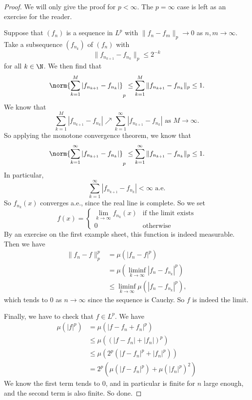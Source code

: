 \documentclass[a4paper]{article}
\begin{document}
\begin{proof}
  We will only give the proof for $p < \infty$. The $p = \infty$ case is left as an exercise for the reader.

  Suppose that $(f_n)$ is a sequence in $L^p$ with $\|f_n - f_m\|_p \to 0$ as $n, m \to \infty$. Take a subsequence $(f_{n_k})$ of $(f_n)$ with
  \[
    \|f_{n_{k + 1}} - f_{n_k}\|_p \leq 2^{-k}
  \]
  for all $k \in \N$. We then find that
  \[
    \norm{\sum_{k = 1}^M |f_{n_{k + 1}} - f_{n_k}|}_p \leq \sum_{k = 1}^M \|f_{n_{k + 1}} - f_{n_k}\|_p \leq 1.
  \]
  We know that
  \[
    \sum_{k = 1}^M |f_{n_{k + 1}} - f_{n_k}| \nearrow \sum_{k = 1}^\infty |f_{n_{k + 1}} - f_{n_k}|\text{ as }M \to \infty.
  \]
  So applying the monotone convergence theorem, we know that
  \[
    \norm{\sum_{k = 1}^\infty |f_{n_{k + 1}} - f_{n_k}|}_p \leq \sum_{k = 1}^\infty \|f_{n_{k + 1}} - f_{n_k}\|_p \leq 1.
  \]
  In particular,
  \[
    \sum_{k = 1}^\infty |f_{n_{k + 1}} - f_{n_k}| < \infty \text{ a.e.}
  \]
  So $f_{n_k}(x)$ converges a.e., since the real line is complete. So we set
  \[
    f(x) =
    \begin{cases}
      \lim_{k \to \infty} f_{n_k}(x) & \text{if the limit exists}\\
      0 & \text{otherwise}
    \end{cases}
  \]
  By an exercise on the first example sheet, this function is indeed measurable. Then we have
  \begin{align*}
    \|f_n - f\|_p^p &= \mu(|f_n - f|^p) \\
    &= \mu\left(\liminf_{k \to \infty} |f_n - f_{n_k}|^p\right)\\
    &\leq \liminf_{k \to \infty} \mu(|f_n - f_{n_k}|^p),
  \end{align*}
  which tends to $0$ as $n \to \infty$ since the sequence is Cauchy. So $f$ is indeed the limit.

  Finally, we have to check that $f \in L^p$. We have
  \begin{align*}
    \mu(|f|^p) &= \mu(|f - f_n + f_n|^p)\\
    &\leq \mu((|f - f_n| + |f_n|)^p)\\
    &\leq \mu(2^p (|f - f_n|^p + |f_n|^p))\\
    &= 2^p (\mu(|f - f_n|^p) + \mu(|f_n|^p)^2)
  \end{align*}
  We know the first term tends to $0$, and in particular is finite for $n$ large enough, and the second term is also finite. So done.
\end{proof}
\end{document}
